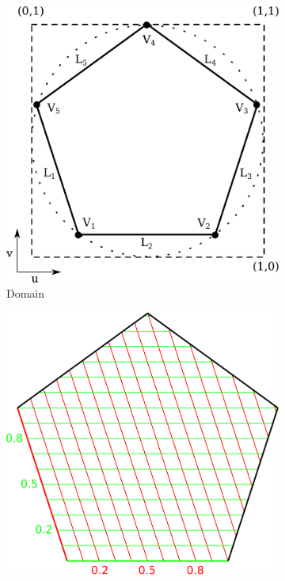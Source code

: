 \documentclass[9pt,academicons]{article}
\begin{document}
\begin{figure}
  \begin{subfigure}{0.30\textwidth}
    \includegraphics[width = \textwidth]{images/domain.pdf}
    \caption{Domain}
    \label{fig:domain}
  \end{subfigure}
  \hfill
  \begin{subfigure}{0.30\textwidth}
    \begin{minipage}[b][5cm][b]{\textwidth}
      \centering
      \includegraphics[width = \textwidth]{images/h-params.pdf}

\end{minipage}
\end{subfigure}
\end{figure}
\end{document}
